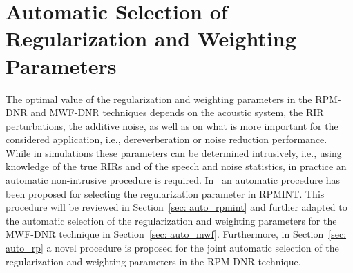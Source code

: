 \documentclass[10pt]{IEEEtran}
\begin{document}
\section{Automatic Selection of \\ Regularization and Weighting Parameters}
\label{sec: auto}
The optimal value of the regularization and weighting parameters in the RPM-DNR and MWF-DNR techniques depends on the acoustic system, the RIR perturbations, the additive noise, as well as on what is more important for the considered application, i.e., dereverberation or noise reduction performance.
While in simulations these parameters can be determined intrusively, i.e., using knowledge of the true RIRs and of the speech and noise statistics, in practice an automatic non-intrusive procedure is required.
In~\cite{Kodrasi_ITASLP_2013} an automatic procedure has been proposed for selecting the regularization parameter in RPMINT.
This procedure will be reviewed in Section~\ref{sec: auto_rpmint} and further adapted to the automatic selection of the regularization and weighting parameters for the MWF-DNR technique in Section~\ref{sec: auto_mwf}.
Furthermore, in Section~\ref{sec: auto_rp} a novel procedure is proposed for the joint automatic selection of the regularization and weighting parameters in the RPM-DNR technique.
\end{document}

